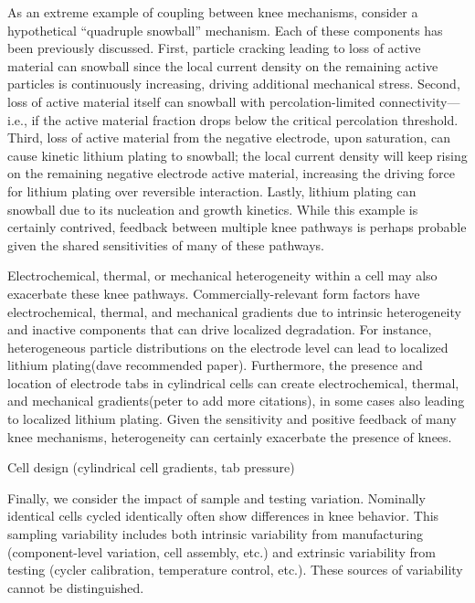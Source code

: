 \documentclass[journal=jpclcd,manuscript=article]{achemso}
\begin{document}
As an extreme example of coupling between knee mechanisms, consider a hypothetical “quadruple snowball” mechanism. Each of these components has been previously discussed. First, particle cracking leading to loss of active material can snowball since the local current density on the remaining active particles is continuously increasing, driving additional mechanical stress. Second, loss of active material itself can snowball with percolation-limited connectivity---i.e., if the active material fraction drops below the critical percolation threshold. Third, loss of active material from the negative electrode, upon saturation, can cause kinetic lithium plating to snowball; the local current density will keep rising on the remaining negative electrode active material, increasing the driving force for lithium plating over reversible interaction. Lastly, lithium plating can snowball due to its nucleation and growth kinetics. While this example is certainly contrived, feedback between multiple knee pathways is perhaps probable given the shared sensitivities of many of these pathways. 

Electrochemical, thermal, or mechanical heterogeneity within a cell may also exacerbate these knee pathways. Commercially-relevant form factors have electrochemical, thermal, and mechanical gradients due to intrinsic heterogeneity and inactive components that can drive localized degradation. For instance, heterogeneous particle distributions on the electrode level can lead to localized lithium plating(dave recommended paper). Furthermore, the presence and location of electrode tabs in cylindrical cells can create electrochemical, thermal, and mechanical gradients\cite{bach_nonlinear_2016}(peter to add more citations), in some cases also leading to localized lithium plating\cite{bach_nonlinear_2016}. Given the sensitivity and positive feedback of many knee mechanisms, heterogeneity can certainly exacerbate the presence of knees.

\cite{liu_size_2018, okasinski_situ_2020}
Cell design (cylindrical cell gradients, tab pressure)

Finally, we consider the impact of sample and testing variation. Nominally identical cells cycled identically often show differences in knee behavior. This sampling variability includes both intrinsic variability from manufacturing (component-level variation, cell assembly, etc.) and extrinsic variability from testing (cycler calibration, temperature control, etc.). These sources of variability cannot be distinguished.
\end{document}
